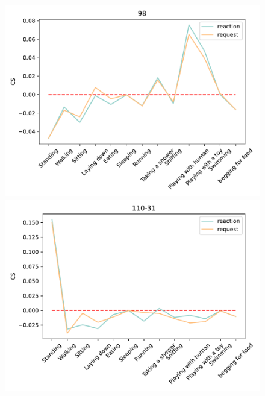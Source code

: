 \begin{figure}[ht]
\begin{minipage}[b]{.3\linewidth}
		\end{minipage}
		
				\begin{minipage}[b]{.3\linewidth}
			\centering
			\includegraphics[width=0.99\linewidth]{./35word/98.pdf}
		\end{minipage}
		\begin{minipage}[b]{.3\linewidth}
			\centering
			\includegraphics[width=0.99\linewidth]{./35word/110-31.pdf}
		\end{minipage}
		\begin{minipage}[b]{.3\linewidth}
			\centering

\end{minipage}
\end{figure}
